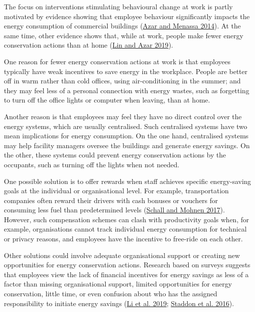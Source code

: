 \documentclass[
  11pt,
]{article}
\begin{document}
The focus on interventions stimulating behavioural change at work is
partly motivated by evidence showing that employee behaviour
significantly impacts the energy consumption of commercial buildings
(\protect\hyperlink{ref-azar2014comprehensive}{Azar and Menassa 2014}).
At the same time, other evidence shows that, while at work, people make
fewer energy conservation actions than at home
(\protect\hyperlink{ref-lin2019mixing}{Lin and Azar 2019}).

One reason for fewer energy conservation actions at work is that
employees typically have weak incentives to save energy in the
workplace. People are better off in warm rather than cold offices, using
air-conditioning in the summer; and they may feel less of a personal
connection with energy wastes, such as forgetting to turn off the office
lights or computer when leaving, than at home.

Another reason is that employees may feel they have no direct control
over the energy systems, which are usually centralised. Such centralised
systems have two mean implications for energy consumption. On the one
hand, centralised systems may help facility managers oversee the
buildings and generate energy savings. On the other, these systems could
prevent energy conservation actions by the occupants, such as turning
off the lights when not needed.

One possible solution is to offer rewards when staff achieves specific
energy-saving goals at the individual or organisational level. For
example, transportation companies often reward their drivers with cash
bonuses or vouchers for consuming less fuel than predetermined levels
(\protect\hyperlink{ref-schall2017incentivizing}{Schall and Mohnen
2017}). However, such compensation schemes can clash with productivity
goals when, for example, organisations cannot track individual energy
consumption for technical or privacy reasons, and employees have the
incentive to free-ride on each other.

Other solutions could involve adequate organisational support or
creating new opportunities for energy conservation actions. Research
based on surveys suggests that employees view the lack of financial
incentives for energy savings as less of a factor than missing
organisational support, limited opportunities for energy conservation,
little time, or even confusion about who has the assigned responsibility
to initiate energy savings
(\protect\hyperlink{ref-li2019understanding}{Li et al. 2019};
\protect\hyperlink{ref-staddon2016intervening}{Staddon et al. 2016}).
\end{document}
